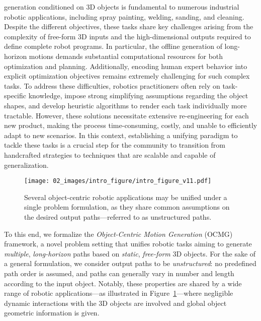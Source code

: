  generation conditioned on 3D objects is fundamental to numerous industrial robotic applications, including spray painting, welding, sanding, and cleaning.
Despite the different objectives, these tasks share key challenges arising from the complexity of free-form 3D inputs and the high-dimensional outputs required to define complete robot programs.
In particular, the offline generation of long-horizon motions demands substantial computational resources for both optimization and planning.
Additionally, encoding human expert behavior into explicit optimization objectives remains extremely challenging for such complex tasks.
%
To address these difficulties, robotics practitioners often rely on task-specific knowledge, impose strong simplifying assumptions regarding the object shapes, and develop heuristic algorithms to render each task individually more tractable.
%
However, these solutions necessitate extensive re-engineering for each new product, making the process time-consuming, costly, and unable to efficiently adapt to new scenarios. 
%
In this context, establishing a unifying paradigm to tackle these tasks is a crucial step for the community to transition from handcrafted strategies to techniques that are scalable and capable of generalization.

\begin{figure}[t]
    \centering
    \texttt{[image: 02\_images/intro\_figure/intro\_figure\_v11.pdf]}
    \caption{Several object-centric robotic applications may be unified under a single problem formulation, as they share common assumptions on the desired output paths---referred to as unstructured paths.}
    \vspace{-6pt}
    \label{fig:intro_figure}
\end{figure}

To this end, we formalize the \emph{Object-Centric Motion Generation} (OCMG) framework, a novel problem setting that unifies robotic tasks aiming to generate \emph{multiple}, \emph{long-horizon} paths based on \emph{static}, \emph{free-form} 3D objects.
For the sake of a general formulation, we consider output paths to be \emph{unstructured}: no predefined path order is assumed, and paths can generally vary in number and length according to the input object.
Notably, these properties are shared by a wide range of robotic applications---as illustrated in Figure~\ref{fig:intro_figure}---where negligible dynamic interactions with the 3D objects are involved
and global object geometric information is given.


